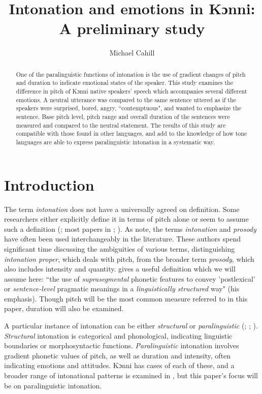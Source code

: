 \documentclass[output=paper]{langsci/langscibook}
\title{Intonation and emotions in Kɔnni: A preliminary study}
\author{%
 Michael Cahill\affiliation{Cahill affiliation} 
}
\begin{document}
\begin{abstract}
One of the paralinguistic functions of intonation is the use of gradient changes of pitch and duration to indicate emotional states of the speaker. This study examines the difference in pitch of Kɔnni native speakers' speech which accompanies several different emotions. A neutral utterance was compared to the same sentence uttered as if the speakers were surprised, bored, angry, ``contemptuous", and wanted to emphasize the sentence. Base pitch level, pitch range and overall duration of the sentences were measured and compared to the neutral statement. The results of this study are compatible with those found in other languages, and add to the knowledge of how tone languages are able to express paralinguistic intonation in a systematic way.
\end{abstract}

\section{Introduction}
The term \emph{intonation} does not have a universally agreed on definition. Some researchers either explicitly define it in terms of pitch alone or seem to assume such a definition (\citealt{lieberman1967}; most papers in \citealt{bolinger1972}; \citealt{gussenhoven2004}). As \citet[3]{hirstdicristo1998} note, the terms \emph{intonation} and \emph{prosody} have often been used interchangeably in the literature. These authors spend significant time discussing the ambiguities of various terms, distinguishing \emph{intonation proper}, which deals with pitch, from the broader term \emph{prosody}, which also includes intensity and quantity. \citet[4]{ladd2008} gives a useful definition which we will assume here: ``the use of \emph{suprasegmental} phonetic features to convey 'postlexical' or \emph{sentence-level} pragmatic meanings in a \emph{linguistically structured} way" (his emphasis). Though pitch will be the most common measure referred to in this paper, duration will also be examined. 

A particular instance of intonation can be either \emph{structural} or \emph{paralinguistic} (\citealt{gussenhoven2004}; \citealt{laddetal1986}; \citealt{ladd2008}). \emph{Structural} intonation is categorical and phonological, indicating linguistic boundaries or morphosyntactic functions. \emph{Paralinguistic} intonation involves gradient phonetic values of pitch, as well as duration and intensity, often indicating emotions and attitudes. Kɔnni has cases of each of these, and a broader range of intonational patterns is examined in \citet{cahillforth}, but this paper's focus will be on paralinguistic intonation.
\end{document}
